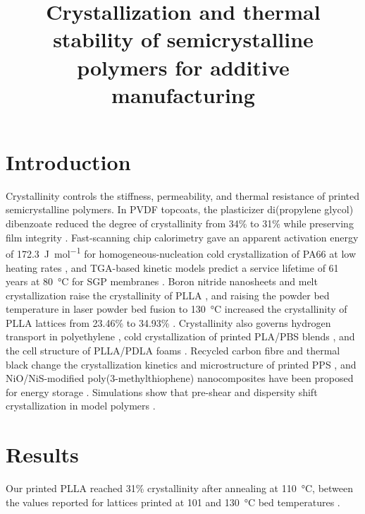 \documentclass{article}
\title{Crystallization and thermal stability of semicrystalline polymers for additive manufacturing}
\author{}
\date{}
\begin{document}
\maketitle

\section{Introduction}
Crystallinity controls the stiffness, permeability, and thermal resistance of printed semicrystalline polymers. In PVDF topcoats, the plasticizer di(propylene glycol) dibenzoate reduced the degree of crystallinity from 34\% to 31\% while preserving film integrity \cite{sonnendecker2025}. Fast-scanning chip calorimetry gave an apparent activation energy of \SI{172.3}{\joule\per\mole} for homogeneous-nucleation cold crystallization of PA66 at low heating rates \cite{tan2026pa66}, and TGA-based kinetic models predict a service lifetime of 61 years at \SI{80}{\celsius} for SGP membranes \cite{xie2025tga}. Boron nitride nanosheets and melt crystallization raise the crystallinity of PLLA \cite{chen2026pllla}, and raising the powder bed temperature in laser powder bed fusion to \SI{130}{\celsius} increased the crystallinity of PLLA lattices from 23.46\% to 34.93\% \cite{li2026lattice}. Crystallinity also governs hydrogen transport in polyethylene \cite{merlonghi2026}, cold crystallization of printed PLA/PBS blends \cite{novak2025}, and the cell structure of PLLA/PDLA foams \cite{yang2025foam}. Recycled carbon fibre and thermal black change the crystallization kinetics and microstructure of printed PPS \cite{arslan2026pps}, and NiO/NiS-modified poly(3-methylthiophene) nanocomposites have been proposed for energy storage \cite{xavier2024oxide}. Simulations show that pre-shear and dispersity shift crystallization in model polymers \cite{2604_11706}.

\section{Results}
Our printed PLLA reached 31\% crystallinity after annealing at \SI{110}{\celsius}, between the values reported for lattices printed at 101 and \SI{130}{\celsius} bed temperatures \cite{li2026lattice}.



\end{document}

